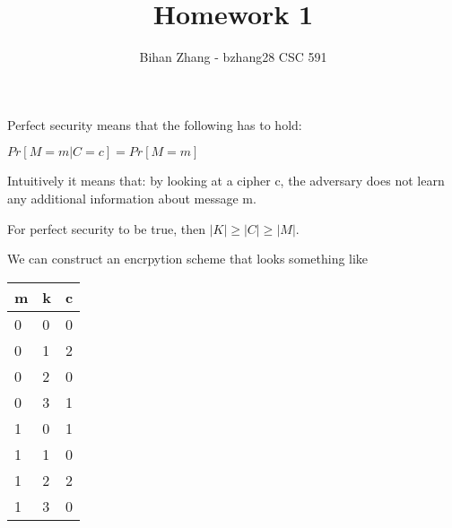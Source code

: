 \documentclass[12pt]{article}
\newenvironment{question}[2][Question]{\begin{trivlist}
		\item[\hskip \labelsep {\bfseries #1}\hskip \labelsep {\bfseries #2.}]}{\end{trivlist}}
\begin{document}
	
	
	
	\title{Homework 1}%
	\author{Bihan Zhang - bzhang28 %
		CSC 591} %
	
	\maketitle
	
	
	\begin{question}{1a} 
			Perfect security means that the following has to hold:
			
			$Pr[M = m|C = c] = Pr[M = m]$
			
			Intuitively it means that: by looking at a cipher c, the adversary does not learn any additional information about message m. 
			
			For perfect security to be true, then $|K|\geq|C|\geq|M|$.
			
			We can construct an encrpytion scheme that looks something like 
			

	\begin{tabular}{lll}
		m                       & k                      & c                      \\ \hline
		\multicolumn{1}{|l|}{0} & \multicolumn{1}{l|}{0} & \multicolumn{1}{l|}{0} \\ \hline
		\multicolumn{1}{|l|}{0} & \multicolumn{1}{l|}{1} & \multicolumn{1}{l|}{2} \\ \hline
		\multicolumn{1}{|l|}{0} & \multicolumn{1}{l|}{2} & \multicolumn{1}{l|}{0} \\ \hline
		\multicolumn{1}{|l|}{0} & \multicolumn{1}{l|}{3} & \multicolumn{1}{l|}{1} \\ \hline
		\multicolumn{1}{|l|}{1} & \multicolumn{1}{l|}{0} & \multicolumn{1}{l|}{1} \\ \hline
		\multicolumn{1}{|l|}{1} & \multicolumn{1}{l|}{1} & \multicolumn{1}{l|}{0} \\ \hline
		\multicolumn{1}{|l|}{1} & \multicolumn{1}{l|}{2} & \multicolumn{1}{l|}{2} \\ \hline
		\multicolumn{1}{|l|}{1} & \multicolumn{1}{l|}{3} & \multicolumn{1}{l|}{0} \\ \hline
	\end{tabular}




\end{question}
\end{document}

